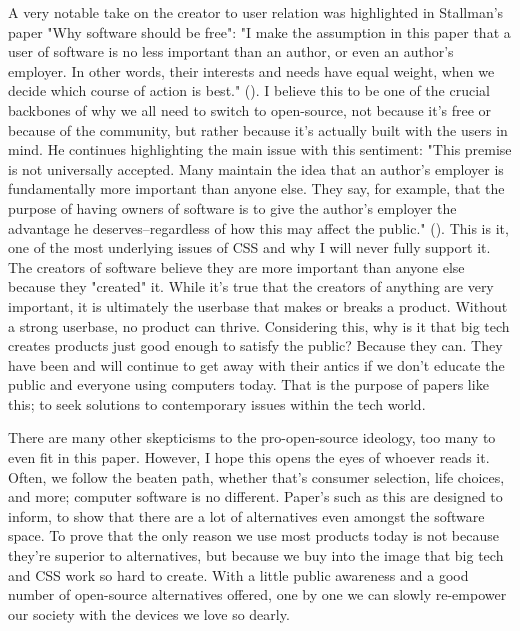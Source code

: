 \documentclass[11pt]{article}
\begin{document}
A very notable take on the creator to user relation was highlighted in Stallman’s paper "Why software should be free": "I make the assumption in this paper that a user of software is no less important than an author, or even an author's employer. In other words, their interests and needs have equal weight, when we decide which course of action is best." (\cite{whySoftwareShouldBeFree}). I believe this to be one of the crucial backbones of why we all need to switch to open-source, not because it's free or because of the community, but rather because it's actually built with the users in mind. He continues highlighting the main issue with this sentiment: "This premise is not universally accepted. Many maintain the idea that an author's employer is fundamentally more important than anyone else. They say, for example, that the purpose of having owners of software is to give the author's employer the advantage he deserves--regardless of how this may affect the public." (\cite{whySoftwareShouldBeFree}). This is it, one of the most underlying issues of CSS and why I will never fully support it. The creators of software believe they are more important than anyone else because they "created" it. While it's true that the creators of anything are very important, it is ultimately the userbase that makes or breaks a product. Without a strong userbase, no product can thrive. Considering this, why is it that big tech creates products just good enough to satisfy the public? Because they can. They have been and will continue to get away with their antics if we don't educate the public and everyone using computers today. That is the purpose of papers like this; to seek solutions to contemporary issues within the tech world.

There are many other skepticisms to the pro-open-source ideology, too many to even fit in this paper. However, I hope this opens the eyes of whoever reads it. Often, we follow the beaten path, whether that's consumer selection, life choices, and more; computer software is no different. Paper's such as this are designed to inform, to show that there are a lot of alternatives even amongst the software space. To prove that the only reason we use most products today is not because they're superior to alternatives, but because we buy into the image that big tech and CSS work so hard to create. With a little public awareness and a good number of open-source alternatives offered, one by one we can slowly re-empower our society with the devices we love so dearly.  

\newpage
\nocite{GNUGPLv3}
\printbibliography[title={\normalsize References}]
\end{document}
